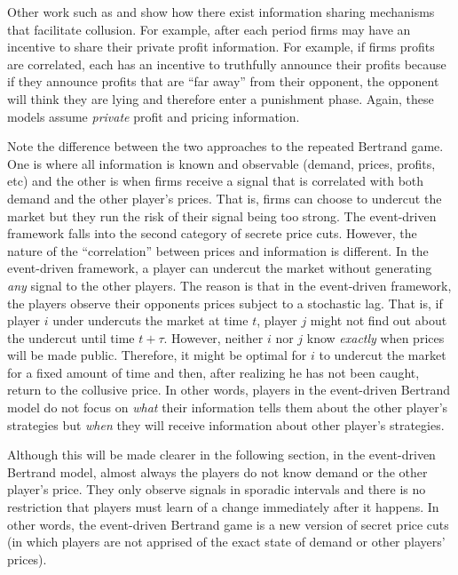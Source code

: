 \documentclass{article}
\begin{document}
Other work such as \cite{powercomm} and \cite{commandcoll} show how
there exist information sharing mechanisms that facilitate collusion.
For example, after each period firms may have an incentive to share
their private profit information.  For example, if firms profits are
correlated, each has an incentive to truthfully announce their profits
because if they announce profits that are ``far away'' from their
opponent, the opponent will think they are lying and therefore enter a
punishment phase.  Again, these models assume \emph{private} profit
and pricing information.

Note the difference between the two approaches to the repeated
Bertrand game.  One is where all information is known and observable
(demand, prices, profits, etc) and the other is when firms receive a
signal that is correlated with both demand and the other player's
prices.  That is, firms can choose to undercut the market but they run
the risk of their signal being too strong.  The event-driven framework
falls into the second category of secrete price cuts.  However, the
nature of the ``correlation'' between prices and information is
different.  In the event-driven framework, a player can undercut the
market without generating \emph{any} signal to the other players.  The
reason is that in the event-driven framework, the players observe
their opponents prices subject to a stochastic lag.  That is, if
player $i$ under undercuts the market at time $t$, player $j$ might
not find out about the undercut until time $t+\tau$.  However, neither
$i$ nor $j$ know \emph{exactly} when prices will be made public.
Therefore, it might be optimal for $i$ to undercut the market for a
fixed amount of time and then, after realizing he has not been caught,
return to the collusive price.  In other words, players in the
event-driven Bertrand model do not focus on \textit{what} their
information tells them about the other player's strategies but
\emph{when} they will receive information about other player's
strategies.

Although this will be made clearer in the following section, in the
event-driven Bertrand model, almost always the players do not know
demand or the other player's price.  They only observe signals in
sporadic intervals and there is no restriction that players must learn
of a change immediately after it happens.  In other words, the
event-driven Bertrand game is a new version of secret price cuts
(in which players are not apprised of the exact state of demand or
other players' prices).
\end{document}
